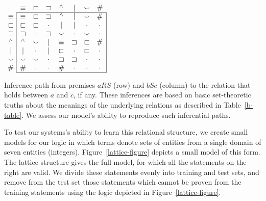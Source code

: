 \begin{table}[htp]
  \centering  
  \setlength{\arraycolsep}{8pt}
  \renewcommand{\arraystretch}{1.1}
  \newcommand{\UNK}{\cdot}  
  $\begin{array}[t]{c@{ \ }|*{7}{c}|}
    \multicolumn{1}{c}{}
             & \nateq     & \natfor     & \natrev     & \natneg    & \natalt     & \natcov     & \multicolumn{1}{c}{\natind} \\
    \cline{2-8}
    \nateq  & \nateq &   \natfor &  \natrev &  \natneg &   \natalt &  \natcov &  \natind \\
    \natfor & \natfor &  \natfor &  \UNK &  \natalt &   \natalt &  \UNK &  \UNK \\
    \natrev & \natrev &  \UNK &  \natrev &  \natcov &   \UNK &  \natcov &  \UNK \\
    \natneg & \natneg &  \natcov &  \natalt &  \nateq &    \natrev &  \natfor &  \natind \\
    \natalt & \natalt &  \UNK &  \natalt &  \natfor &   \UNK &  \natfor &  \UNK \\
    \natcov & \natcov &  \natcov &  \UNK &  \natrev &   \natrev &  \UNK &  \UNK \\
    \natind & \natind & \UNK &  \UNK &  \natind &  \UNK &  \UNK &  \UNK \\
    \cline{2-8}
  \end{array}$
  \caption{Inference path from premises $a R S$ (row) and $b S c$ (column) to the relation that holds between $a$ and $c$, if any.  These inferences are based on basic set-theoretic truths about the meanings of the underlying relations as described in Table~\ref{b-table}. We assess our model's ability to reproduce such inferential paths.}
  \label{tab:jointable}
\end{table}

To test our systems's ability to learn this relational structure, we
create small models for our logic in which terms denote sets of
entities from a single domain of seven entities (integers).
Figure~\ref{lattice-figure} depicts a small model of this form. The
lattice structure gives the full model, for which all the statements on
the right are valid. We divide these statements evenly into training and
test sets, and remove from the test set those statements which cannot be 
proven from the training statements using the logic depicted in 
Figure~\ref{lattice-figure}.

